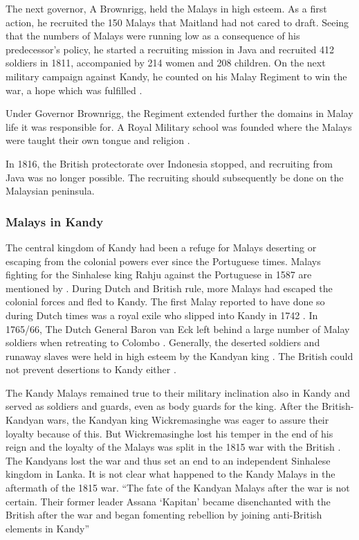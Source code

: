The next governor, A \kuckn  Brownrigg, held the Malays in high esteem. As a first action, he recruited the 150 Malays that Maitland had not cared to draft. Seeing that the numbers of Malays were running low as a consequence of his predecessor's policy, he started a recruiting mission in Java and recruited 412 soldiers in 1811, accompanied by 214 women and 208 children. On the next military campaign against Kandy, he counted on his Malay Regiment to win the war, a hope which was fulfilled \citep[68,81f]{Hussainmiya1990}.

Under Governor Brownrigg, the Regiment extended further the domains in Malay life it was responsible for. A Royal Military school was founded where the Malays were taught their own tongue and religion \citep[96]{Hussainmiya1990}.

In 1816, the British protectorate over Indonesia stopped, and
recruiting from Java was no longer possible. The recruiting should
subsequently be done on the Malaysian peninsula.

\subsubsection{Malays in Kandy}\label{sec:slmbg:MalaysinKandy}
The central kingdom of Kandy had been a refuge for Malays
deserting or escaping from the colonial powers ever since the
Portuguese times. Malays fighting for the Sinhalese king Rahju
against the Portuguese in 1587 are mentioned by
\citet[26]{Powell1973}. During Dutch and British rule, more Malays
had escaped the colonial forces and fled to Kandy.  The first
Malay  reported to have done so during Dutch times was a royal
exile who slipped into Kandy in 1742 \citep[69]{Hussainmiya1990}.
In 1765/66, The Dutch General Baron van Eck left behind a large
number of Malay soldiers when retreating to Colombo
\citep[37f]{Powell1973}. Generally, the deserted soldiers and
runaway slaves were held in high esteem by the Kandyan king
\citep[78]{Hussainmiya1990}. The British could not prevent
desertions to Kandy either \citep[67]{Hussainmiya1990}.

The Kandy Malays remained true to their military inclination also in Kandy and served as soldiers and guards, even as body guards for the king. After the British-Kandyan wars, the Kandyan king Wickremasinghe was eager to assure their loyalty because of this. But Wickremasinghe lost his temper in the end of his reign \citep[71]{Hussainmiya1990} and the loyalty of the Malays was split in the 1815 war with the British \citep[83]{Hussainmiya1990}. The Kandyans lost the war and thus set an end to an independent Sinhalese kingdom in Lanka. It is not clear what happened to the Kandy Malays in the aftermath of the 1815 war. ``The fate of the Kandyan Malays after the war is not certain. \el Their former leader Assana `Kapitan' became disenchanted with the British after the war and began fomenting rebellion by joining anti-British elements in Kandy''\citep[83]{Hussainmiya1990}

